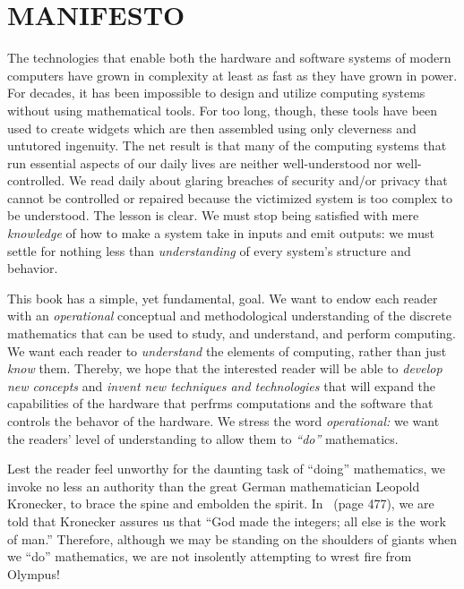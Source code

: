 
\chapter*{MANIFESTO}

The technologies that enable both the hardware and software systems of
modern computers have grown in complexity at least as fast as they
have grown in power.  For decades, it has been impossible to design
and utilize computing systems without using mathematical tools.  For
too long, though, these tools have been used to create widgets which
are then assembled using only cleverness and untutored ingenuity.  The
net result is that many of the computing systems that run essential
aspects of our daily lives are neither well-understood nor
well-controlled.  We read daily about glaring breaches of security
and/or privacy that cannot be controlled or repaired because the
victimized system is too complex to be understood.  The lesson is
clear.  We must stop being satisfied with mere {\em knowledge} of how
to make a system take in inputs and emit outputs: we must settle for
nothing less than {\em understanding} of every system's structure and
behavior.

This book has a simple, yet fundamental, goal.  We want to endow each
reader with an {\em operational} conceptual and methodological
understanding of the discrete mathematics that can be used to study,
and understand, and perform computing.  We want each reader to {\em
  understand} the elements of computing, rather than just {\em know}
them.  Thereby, we hope that the interested reader will be able to
{\em develop new concepts} and {\em invent new techniques and
  technologies} that will expand the capabilities of the hardware that
perfrms computations and the software that controls the behavor of the
hardware.  We stress the word {\it operational:} we want the readers'
level of understanding to allow them to {\em ``do''} mathematics.

\bigskip

Lest the reader feel unworthy for the daunting task of ``doing''
mathematics, we invoke no less an authority than the great German
mathematician Leopold Kronecker,  to brace
the spine and embolden the spirit.  In~\cite{Bell86} (page 477), we
are told that Kronecker assures us that ``God made the integers; all
else is the work of man.''  Therefore, although we may be standing on
the shoulders of giants when we ``do'' mathematics, we are not
insolently attempting to wrest fire from Olympus!



